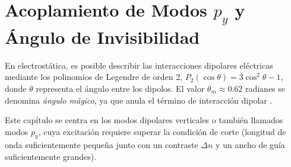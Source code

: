\chapter{Acoplamiento de Modos $p_y$ y Ángulo de Invisibilidad \label{cap:invisibility}}

En electrostática, es posible describir las interacciones dipolares eléctricas mediante los polinomios de Legendre de orden 2, $P_2(\cos\theta) = 3\cos^2\theta - 1$, donde $\theta$ representa el ángulo entre los dipolos. El valor $\theta_m \approx 0.62$ radianes se denomina \textit{ángulo mágico}, ya que anula el término de interacción dipolar \citep{medmagic}.

Este capítulo se centra en los modos dipolares verticales o también llamados modos $p_y$, cuya excitación requiere superar la condición de corte (longitud de onda suficientemente pequeña junto con un contraste $\Delta n$ y un ancho de guía suficientemente grandes).
